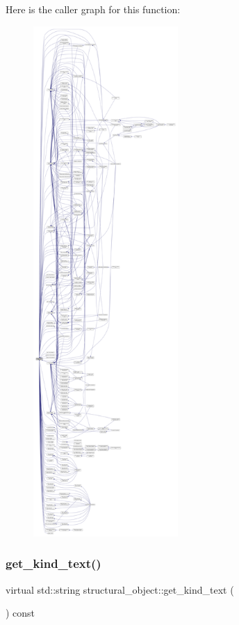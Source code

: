 Here is the caller graph for this function\+:
\nopagebreak
\begin{figure}[H]
\begin{center}
\leavevmode
\includegraphics[height=550pt]{d8/da3/classstructural__object_ad9f487c3b7774ecd4e2f55979c434cd0_icgraph}
\end{center}
\end{figure}
\mbox{\label{classstructural__object_a36c541b52425c4de8fa45d79285a97e7}} 
\subsubsection{\texorpdfstring{get\+\_\+kind\+\_\+text()}{get\_kind\_text()}}
{\footnotesize\ttfamily virtual std\+::string structural\+\_\+object\+::get\+\_\+kind\+\_\+text (\begin{DoxyParamCaption}{ }\end{DoxyParamCaption}) const\hspace{0.3cm}{\ttfamily [pure virtual]}}



